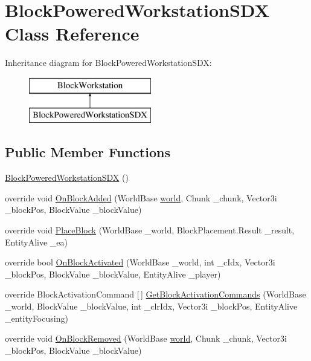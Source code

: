 \hypertarget{class_block_powered_workstation_s_d_x}{}\section{Block\+Powered\+Workstation\+S\+DX Class Reference}
\label{class_block_powered_workstation_s_d_x}
Inheritance diagram for Block\+Powered\+Workstation\+S\+DX\+:\begin{figure}[H]
\begin{center}
\leavevmode
\includegraphics[height=2.000000cm]{d2/d9b/class_block_powered_workstation_s_d_x}
\end{center}
\end{figure}
\subsection*{Public Member Functions}
\begin{DoxyCompactItemize}
\item 
\mbox{\hyperlink{class_block_powered_workstation_s_d_x_afed7f31e6bd7d45885b86ff818ffbf6d}{Block\+Powered\+Workstation\+S\+DX}} ()
\item 
override void \mbox{\hyperlink{class_block_powered_workstation_s_d_x_a7b62e07a42da3cb89ce0e47df42ab341}{On\+Block\+Added}} (World\+Base \mbox{\hyperlink{_sphere_i_i_01_music_01_boxes_2_config_2_localization_8txt_a7ede01351426b1b7f6c1ce5f794e474f}{world}}, Chunk \+\_\+chunk, Vector3i \+\_\+block\+Pos, Block\+Value \+\_\+block\+Value)
\item 
override void \mbox{\hyperlink{class_block_powered_workstation_s_d_x_ab4cdc00b9a432a250cc3e733286c41cd}{Place\+Block}} (World\+Base \+\_\+world, Block\+Placement.\+Result \+\_\+result, Entity\+Alive \+\_\+ea)
\item 
override bool \mbox{\hyperlink{class_block_powered_workstation_s_d_x_a04b461d7ce4512b302f5689850adb1ae}{On\+Block\+Activated}} (World\+Base \+\_\+world, int \+\_\+c\+Idx, Vector3i \+\_\+block\+Pos, Block\+Value \+\_\+block\+Value, Entity\+Alive \+\_\+player)
\item 
override Block\+Activation\+Command \mbox{[}$\,$\mbox{]} \mbox{\hyperlink{class_block_powered_workstation_s_d_x_a3faadfd678821f8a708299a5d5d5a9a9}{Get\+Block\+Activation\+Commands}} (World\+Base \+\_\+world, Block\+Value \+\_\+block\+Value, int \+\_\+clr\+Idx, Vector3i \+\_\+block\+Pos, Entity\+Alive \+\_\+entity\+Focusing)
\item 
override void \mbox{\hyperlink{class_block_powered_workstation_s_d_x_aba18512171241067d4337d684d56b556}{On\+Block\+Removed}} (World\+Base \mbox{\hyperlink{_sphere_i_i_01_music_01_boxes_2_config_2_localization_8txt_a7ede01351426b1b7f6c1ce5f794e474f}{world}}, Chunk \+\_\+chunk, Vector3i \+\_\+block\+Pos, Block\+Value \+\_\+block\+Value)
\end{DoxyCompactItemize}


